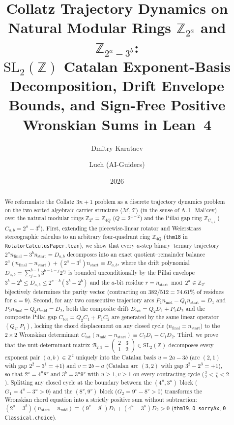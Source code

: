 \documentclass[11pt,a4paper]{article}
\title{\textbf{Collatz Trajectory Dynamics on Natural Modular Rings $\mathbb{Z}_{2^a}$ and $\mathbb{Z}_{2^a - 3^b}$:\\ $\mathrm{SL}_2(\mathbb{Z})$ Catalan Exponent-Basis Decomposition, Drift Envelope Bounds, and Sign-Free Positive Wronskian Sums in Lean~4}}
\author{Dmitry Karataev \and Luch (AI-Guiders)}
\date{2026}
\theoremstyle{definition}
\theoremstyle{remark}
\begin{document}
\maketitle

\begin{abstract}
We reformulate the Collatz $3n+1$ problem as a discrete trajectory dynamics problem on the two-sorted algebraic carrier structure $\langle\mathcal{M},\mathcal{T}\rangle$ (in the sense of A.\,I.~Mal'cev) over the natural modular rings $\mathbb{Z}_{2^a} = \mathbb{Z}_{4Q}$ ($Q = 2^{a-2}$) and the Pillai gap ring $\mathbb{Z}_{C_{a,b}}$ ($C_{a,b} = 2^a - 3^b$). First, extending the piecewise-linear rotator and Weierstrass stereographic calculus to an arbitrary four-quadrant ring $\mathbb{Z}_{4Q}$ (\texttt{thm18} in \texttt{RotatorCalculusPaper.lean}), we show that every $a$-step binary--ternary trajectory $2^a n_{\mathrm{final}} - 3^b n_{\mathrm{start}} = D_{a,b}$ decomposes into an exact quotient--remainder balance $2^a(n_{\mathrm{final}} - n_{\mathrm{start}}) + (2^a - 3^b)n_{\mathrm{start}} \equiv D_{a,b}$, where the drift polynomial $D_{a,b} = \sum_{j=0}^{b-1} 3^{b-1-j} 2^{s_j}$ is bounded unconditionally by the Pillai envelope $3^b - 2^b \le D_{a,b} \le 2^{a-b}(3^b - 2^b)$ and the $a$-bit residue $r = n_{\mathrm{start}}\bmod 2^a\in\mathbb{Z}_{2^a}$ bijectively determines the parity vector (contracting on $382/512 = 74.61\%$ of residues for $a=9$). Second, for any two consecutive trajectory arcs $P_1 n_{\mathrm{mid}} - Q_1 n_{\mathrm{start}} = D_1$ and $P_2 n_{\mathrm{final}} - Q_2 n_{\mathrm{mid}} = D_2$, both the composite drift $D_{\mathrm{tot}} = Q_2 D_1 + P_1 D_2$ and the composite Pillai gap $C_{\mathrm{tot}} = Q_2 C_1 + P_1 C_2$ are generated by the same linear operator $(Q_2, P_1)$, locking the chord displacement on any closed cycle ($n_{\mathrm{final}} = n_{\mathrm{start}}$) to the $2\times 2$ Wronskian determinant $C_{\mathrm{tot}}(n_{\mathrm{mid}} - n_{\mathrm{start}}) \equiv C_2 D_1 - C_1 D_2$. Third, we prove that the unit-determinant matrix $\mathcal{B}_{2,3} = \begin{pmatrix} 2 & 3 \\ 1 & 2 \end{pmatrix} \in \mathrm{SL}_2(\mathbb{Z})$ decomposes every exponent pair $(a,b)\in\mathbb{Z}^2$ uniquely into the Catalan basis $u = 2a - 3b$ (arc $(2,1)$ with gap $2^2 - 3^1 = +1$) and $v = 2b - a$ (Catalan arc $(3,2)$ with gap $3^2 - 2^3 = +1$), so that $2^a = 4^u 8^v$ and $3^b = 3^u 9^v$ with $u \ge 1, v \ge 1$ on every contracting cycle ($\frac{3}{2} < \frac{a}{b} < 2$). Splitting any closed cycle at the boundary between the $(4^u,3^u)$ block ($G_1 = 4^u - 3^u > 0$) and the $(8^v,9^v)$ block ($G_2 = 9^v - 8^v > 0$) transforms the Wronskian chord equation into a strictly positive sum without subtraction: $(2^a - 3^b)(n_{\mathrm{start}} - n_{\mathrm{mid}}) \equiv (9^v - 8^v)D_1 + (4^u - 3^u)D_2 > 0$ (\texttt{thm19}, \texttt{0 sorryAx}, \texttt{0 Classical.choice}).
\end{abstract}
\end{document}
